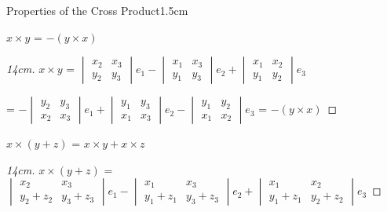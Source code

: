     \begin{ltheorem}{Properties of the Cross Product}{1.5cm}
        \item $x \times y$ = $-(y \times x)$
        
            \begin{proof}[14cm]
                $x \times y$ =
                $\begin{vmatrix}
                    x_2 & x_3 \\
                    y_2 & y_3 
                \end{vmatrix}e_1
                - \begin{vmatrix}
                    x_1 & x_3 \\
                    y_1 & y_3 
                \end{vmatrix}e_2
                + \begin{vmatrix}
                    x_1 & x_2 \\
                    y_1 & y_2 
                \end{vmatrix}e_3$

                \hspace{1cm}
                = $-\begin{vmatrix}
                    y_2 & y_3 \\
                    x_2 & x_3 
                \end{vmatrix}e_1
                + \begin{vmatrix}
                    y_1 & y_3 \\
                    x_1 & x_3 
                \end{vmatrix}e_2
                - \begin{vmatrix}
                    y_1 & y_2 \\
                    x_1 & x_2 
                \end{vmatrix}e_3$
                = $-(y \times x)$
            \end{proof}
        
        \item $x \times (y + z)$ = $x \times y + x \times z$
        
            \begin{proof}[14cm]
                $x \times (y + z)$ =
                $\begin{vmatrix}
                    x_2 & x_3 \\
                    y_2+z_2 & y_3+z_3 
                \end{vmatrix}e_1
                - \begin{vmatrix}
                    x_1 & x_3 \\
                    y_1+z_1 & y_3+z_3 
                \end{vmatrix}e_2
                + \begin{vmatrix}
                    x_1 & x_2 \\
                    y_1+z_1 & y_2+z_2 
                \end{vmatrix}e_3$
                

\end{proof}
\end{ltheorem}
